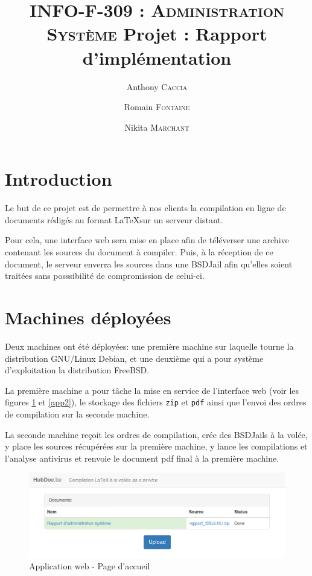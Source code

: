 \documentclass[10pt,a4paper]{article}
\author{Anthony \textsc{Caccia} \and Romain \textsc{Fontaine} \and Nikita \textsc{Marchant} }
\date{}
\title{\textsc{INFO-F-309 : Administration Système} Projet : Rapport d'implémentation}
\begin{document}
\maketitle

\tableofcontents
\newpage

\section{Introduction}
\label{sec:Introduction}

Le but de ce projet est de permettre à nos clients la compilation en ligne de documents rédigés au format \LaTeX sur un serveur distant.

Pour cela, une interface web sera mise en place afin de téléverser une archive contenant les sources du document à compiler.
Puis, à la réception de ce document, le serveur enverra les sources dans une BSDJail afin qu'elles soient traitées sans posssibilité de compromission de celui-ci.

\section{Machines déployées}
\label{sec:Machines déployées}

Deux machines ont été déployées: une première machine sur laquelle tourne la distribution GNU/Linux Debian, et une deuxième qui a pour système d'exploitation la distribution FreeBSD.

La première machine a pour tâche la mise en service de l'interface web
(voir les figures \ref{app1} et \ref{app2}),
le stockage des fichiers \texttt{zip} et \texttt{pdf}
ainsi que l'envoi des ordres de compilation sur la seconde machine.

La seconde machine reçoit les ordres de compilation, crée des BSDJails à la volée, y place les sources récupérées sur la première machine,
y lance les compilations et l'analyse antivirus et renvoie le document pdf final à la première machine.

\begin{figure}[h]
   \centering
   \includegraphics[scale=0.4]{hubdoc.png}
   \caption{\label{app1} Application web - Page d'accueil}
\end{figure}
\end{document}
